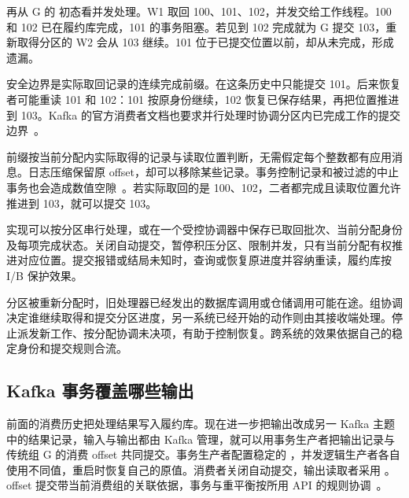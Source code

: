 
再从 G 的  初态看并发处理。W1 取回 100、101、102，并发交给工作线程。100 和 102 已在履约库完成，101 的事务阻塞。若见到 102 完成就为 G 提交 103，重新取得分区的 W2 会从 103 继续。101 位于已提交位置以前，却从未完成，形成遗漏。

安全边界是实际取回记录的连续完成前缀。在这条历史中只能提交 101。后来恢复者可能重读 101 和 102：101 按原身份继续，102 恢复已保存结果，再把位置推进到 103。Kafka 的官方消费者文档也要求并行处理时协调分区内已完成工作的提交边界~\cite{kafka-consumer-api}。


前缀按当前分配内实际取得的记录与读取位置判断，无需假定每个整数都有应用消息。日志压缩保留原 offset，却可以移除某些记录。事务控制记录和被过滤的中止事务也会造成数值空隙~\cite{kafka-design,kafka-consumer-api}。若实际取回的是 100、102，二者都完成且读取位置允许推进到 103，就可以提交 103。


实现可以按分区串行处理，或在一个受控协调器中保存已取回批次、当前分配身份及每项完成状态。关闭自动提交，暂停积压分区、限制并发，只有当前分配有权推进对应位置。提交报错或结局未知时，查询或恢复原进度并容纳重读，履约库按 I/B 保护效果。

分区被重新分配时，旧处理器已经发出的数据库调用或仓储调用可能在途。组协调决定谁继续取得和提交分区进度，另一系统已经开始的动作则由其接收端处理。停止派发新工作、按分配协调未决项，有助于控制恢复。跨系统的效果依据自己的稳定身份和提交规则合流。

\subsection*{Kafka 事务覆盖哪些输出}

前面的消费历史把处理结果写入履约库。现在进一步把输出改成另一 Kafka 主题中的结果记录，输入与输出都由 Kafka 管理，就可以用事务生产者把输出记录与传统组 G 的消费 offset 共同提交。事务生产者配置稳定的 ，并发逻辑生产者各自使用不同值，重启时恢复自己的原值。消费者关闭自动提交，输出读取者采用 。offset 提交带当前消费组的关联依据，事务与重平衡按所用 API 的规则协调~\cite{kafka-design,kafka-consumer-api}。

